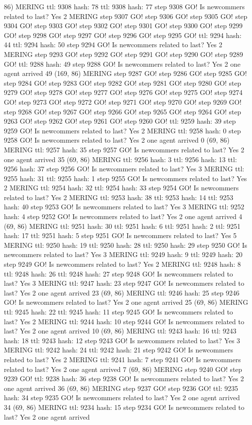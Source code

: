 86) MERING ttl: 9308 hash: 78 ttl: 9308 hash: 77 step 9308 GO! Is newcommers related to last? Yes 2 MERING step 9307 GO! step 9306 GO! step 9305 GO! step 9304 GO! step 9303 GO! step 9302 GO! step 9301 GO! step 9300 GO! step 9299 GO! step 9298 GO! step 9297 GO! step 9296 GO! step 9295 GO! ttl: 9294 hash: 44 ttl: 9294 hash: 50 step 9294 GO! Is newcommers related to last? Yes 2 MERING step 9293 GO! step 9292 GO! step 9291 GO! step 9290 GO! step 9289 GO! ttl: 9288 hash: 49 step 9288 GO! Is newcommers related to last? Yes 2 one agent arrived 49 (169, 86) MERING step 9287 GO! step 9286 GO! step 9285 GO! step 9284 GO! step 9283 GO! step 9282 GO! step 9281 GO! step 9280 GO! step 9279 GO! step 9278 GO! step 9277 GO! step 9276 GO! step 9275 GO! step 9274 GO! step 9273 GO! step 9272 GO! step 9271 GO! step 9270 GO! step 9269 GO! step 9268 GO! step 9267 GO! step 9266 GO! step 9265 GO! step 9264 GO! step 9263 GO! step 9262 GO! step 9261 GO! step 9260 GO! ttl: 9259 hash: 39 step 9259 GO! Is newcommers related to last? Yes 2 MERING ttl: 9258 hash: 0 step 9258 GO! Is newcommers related to last? Yes 2 one agent arrived 0 (69, 86) MERING ttl: 9257 hash: 35 step 9257 GO! Is newcommers related to last? Yes 2 one agent arrived 35 (69, 86) MERING ttl: 9256 hash: 3 ttl: 9256 hash: 13 ttl: 9256 hash: 37 step 9256 GO! Is newcommers related to last? Yes 3 MERING ttl: 9255 hash: 31 ttl: 9255 hash: 1 step 9255 GO! Is newcommers related to last? Yes 2 MERING ttl: 9254 hash: 32 ttl: 9254 hash: 33 step 9254 GO! Is newcommers related to last? Yes 2 MERING ttl: 9253 hash: 38 ttl: 9253 hash: 14 ttl: 9253 hash: 40 step 9253 GO! Is newcommers related to last? Yes 3 MERING ttl: 9252 hash: 4 step 9252 GO! Is newcommers related to last? Yes 2 one agent arrived 4 (69, 86) MERING ttl: 9251 hash: 30 ttl: 9251 hash: 6 ttl: 9251 hash: 2 ttl: 9251 hash: 17 ttl: 9251 hash: 5 step 9251 GO! Is newcommers related to last? Yes 5 MERING ttl: 9250 hash: 19 ttl: 9250 hash: 28 ttl: 9250 hash: 29 step 9250 GO! Is newcommers related to last? Yes 3 MERING ttl: 9249 hash: 9 ttl: 9249 hash: 20 step 9249 GO! Is newcommers related to last? Yes 2 MERING ttl: 9248 hash: 8 ttl: 9248 hash: 26 ttl: 9248 hash: 27 step 9248 GO! Is newcommers related to last? Yes 3 MERING ttl: 9247 hash: 23 step 9247 GO! Is newcommers related to last? Yes 2 one agent arrived 23 (69, 86) MERING ttl: 9246 hash: 25 step 9246 GO! Is newcommers related to last? Yes 2 one agent arrived 25 (69, 86) MERING ttl: 9245 hash: 22 ttl: 9245 hash: 11 step 9245 GO! Is newcommers related to last? Yes 2 MERING ttl: 9244 hash: 10 step 9244 GO! Is newcommers related to last? Yes 2 one agent arrived 10 (69, 86) MERING ttl: 9243 hash: 16 ttl: 9243 hash: 18 ttl: 9243 hash: 12 step 9243 GO! Is newcommers related to last? Yes 3 MERING ttl: 9242 hash: 24 ttl: 9242 hash: 21 step 9242 GO! Is newcommers related to last? Yes 2 MERING ttl: 9241 hash: 7 step 9241 GO! Is newcommers related to last? Yes 2 one agent arrived 7 (69, 86) MERING step 9240 GO! step 9239 GO! ttl: 9238 hash: 36 step 9238 GO! Is newcommers related to last? Yes 2 one agent arrived 36 (69, 86) MERING step 9237 GO! step 9236 GO! ttl: 9235 hash: 34 step 9235 GO! Is newcommers related to last? Yes 2 one agent arrived 34 (69, 86) MERING ttl: 9234 hash: 15 step 9234 GO! Is newcommers related to last? Yes 2 one agent arrived 